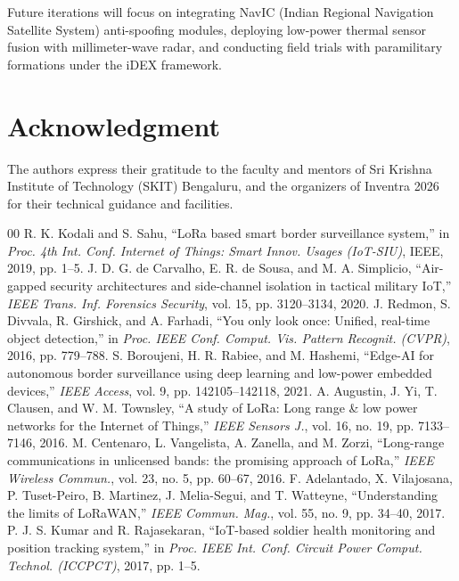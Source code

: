 \documentclass[conference]{IEEEtran}
\begin{document}
Future iterations will focus on integrating NavIC (Indian Regional Navigation Satellite System) anti-spoofing modules, deploying low-power thermal sensor fusion with millimeter-wave radar, and conducting field trials with paramilitary formations under the iDEX framework.

\section*{Acknowledgment}
The authors express their gratitude to the faculty and mentors of Sri Krishna Institute of Technology (SKIT) Bengaluru, and the organizers of Inventra 2026 for their technical guidance and facilities.

\begin{thebibliography}{00}
 R. K. Kodali and S. Sahu, ``LoRa based smart border surveillance system,'' in \textit{Proc. 4th Int. Conf. Internet of Things: Smart Innov. Usages (IoT-SIU)}, IEEE, 2019, pp. 1--5.
 J. D. G. de Carvalho, E. R. de Sousa, and M. A. Simplicio, ``Air-gapped security architectures and side-channel isolation in tactical military IoT,'' \textit{IEEE Trans. Inf. Forensics Security}, vol. 15, pp. 3120--3134, 2020.
 J. Redmon, S. Divvala, R. Girshick, and A. Farhadi, ``You only look once: Unified, real-time object detection,'' in \textit{Proc. IEEE Conf. Comput. Vis. Pattern Recognit. (CVPR)}, 2016, pp. 779--788.
 S. Boroujeni, H. R. Rabiee, and M. Hashemi, ``Edge-AI for autonomous border surveillance using deep learning and low-power embedded devices,'' \textit{IEEE Access}, vol. 9, pp. 142105--142118, 2021.
 A. Augustin, J. Yi, T. Clausen, and W. M. Townsley, ``A study of LoRa: Long range \& low power networks for the Internet of Things,'' \textit{IEEE Sensors J.}, vol. 16, no. 19, pp. 7133--7146, 2016.
 M. Centenaro, L. Vangelista, A. Zanella, and M. Zorzi, ``Long-range communications in unlicensed bands: the promising approach of LoRa,'' \textit{IEEE Wireless Commun.}, vol. 23, no. 5, pp. 60--67, 2016.
 F. Adelantado, X. Vilajosana, P. Tuset-Peiro, B. Martinez, J. Melia-Segui, and T. Watteyne, ``Understanding the limits of LoRaWAN,'' \textit{IEEE Commun. Mag.}, vol. 55, no. 9, pp. 34--40, 2017.
 P. J. S. Kumar and R. Rajasekaran, ``IoT-based soldier health monitoring and position tracking system,'' in \textit{Proc. IEEE Int. Conf. Circuit Power Comput. Technol. (ICCPCT)}, 2017, pp. 1--5.

\end{thebibliography}
\end{document}
